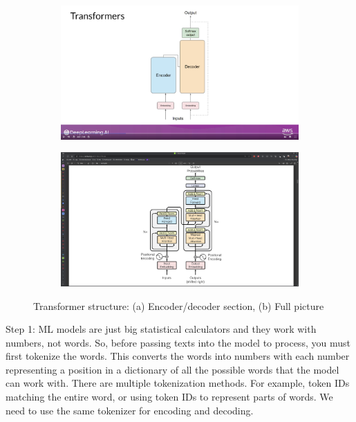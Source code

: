 \documentclass[12pt]{report}
\begin{document}
\begin{figure}
  \centering
  \begin{subfigure}[] %
    \centering
    \includegraphics[trim=3cm 7cm 5cm 0cm,clip,scale=0.11]{pics/transformers.png}
  \end{subfigure}%
  \begin{subfigure}[] %
    \centering
    \includegraphics[trim=10cm 1cm 10cm 5cm,clip,scale=0.12]{pics/arch.png} %
  \end{subfigure}
  \caption{Transformer structure: (a) Encoder/decoder section, (b) Full picture}
\end{figure}

Step 1:
ML models are just big statistical calculators and they work with numbers, not words. So, before passing texts into the model to process, you must first tokenize the words. This converts the words into numbers with each number representing a position in a dictionary of all the possible words that the model can work with. There are multiple tokenization methods. For example, token IDs matching the entire word, or using token IDs to represent parts of words. We need to use the same tokenizer for encoding and decoding.
\end{document}
